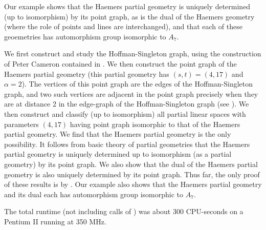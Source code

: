 Our example shows that the Haemers partial geometry \cite{Hae81}
is uniquely determined (up to isomorphism) by its point graph, as is
the dual of the Haemers geometry (where the role of points and lines
are interchanged), and that each of these geoemetries has automorphism
group isomorphic to $A_7$.

We first construct and study the Hoffman-Singleton graph, using the
construction of Peter Cameron contained in \cite{Cam99}.  We then
construct the point graph of the Haemers partial geometry \cite{Hae81}
(this partial geometry has $(s,t)=(4,17)$ and $\alpha=2$). The vertices
of this point graph are the edges of the Hoffman-Singleton graph, and
two such vertices are adjacent in the point graph precisely when they
are at distance 2 in the edge-graph of the Hoffman-Singleton graph (see
\cite{Hae81}).  We then construct and classify (up to isomorphism)
all partial linear spaces with parameters $(4,17)$ having point graph
isomorphic to that of the Haemers partial geometry. We find that
the Haemers partial geometry is the only possibility. It follows from
basic theory of partial geometries that the Haemers partial geometry is
uniquely determined up to isomorphism (as a partial geometry) by its point
graph. We also show that the dual of the Haemers partial geometry is also
uniquely determined by its point graph. Thus far, the only proof of these
results is by {\GRAPE}. Our example also shows that the Haemers partial
geometry and its dual each has automorphism group isomorphic to $A_7$.

The total runtime (not including calls of {\nauty}) was about 300
CPU-seconds on a Pentium II running at 350 MHz.

